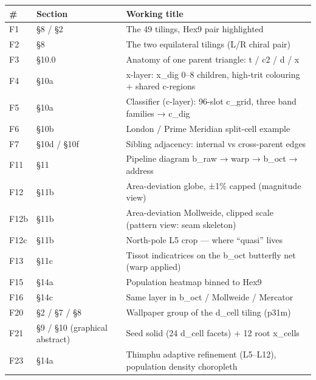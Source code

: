 \documentclass[
  11pt,
  a4paper,
]{article}
\newcounter{none} %
\begin{document}
{\def\LTcaptype{none} %
\begin{longtable}[]{@{}
  >{\raggedright\arraybackslash}p{}
  >{\raggedright\arraybackslash}p{}
  >{\raggedright\arraybackslash}p{}@{}}
\toprule\noalign{}
\begin{minipage}[b]{\linewidth}\raggedright
\#
\end{minipage} & \begin{minipage}[b]{\linewidth}\raggedright
Section
\end{minipage} & \begin{minipage}[b]{\linewidth}\raggedright
Working title
\end{minipage} \\
\midrule\noalign{}
\endhead
\bottomrule\noalign{}
\endlastfoot
F1 & §8 / §2 & The 49 tilings, Hex9 pair highlighted \\
F2 & §8 & The two equilateral tilings (L/R chiral pair) \\
F3 & §10.0 & Anatomy of one parent triangle: t / c2 / d / x \\
F4 & §10a & x-layer: x\_dig 0--8 children, high-trit colouring + shared
c-regions \\
F5 & §10a & Classifier (c-layer): 96-slot c\_grid, three band families →
c\_dig \\
F6 & §10b & London / Prime Meridian split-cell example \\
F7 & §10d / §10f & Sibling adjacency: internal vs cross-parent edges \\
F11 & §11 & Pipeline diagram b\_raw → warp → b\_oct → address \\
F12 & §11b & Area-deviation globe, ±1\% capped (magnitude view) \\
F12b & §11b & Area-deviation Mollweide, clipped scale (pattern view:
seam skeleton) \\
F12c & §11b & North-pole L5 crop --- where ``quasi'' lives \\
F13 & §11c & Tissot indicatrices on the b\_oct butterfly net (warp
applied) \\
F15 & §14a & Population heatmap binned to Hex9 \\
F16 & §14c & Same layer in b\_oct / Mollweide / Mercator \\
F20 & §2 / §7 / §8 & Wallpaper group of the d\_cell tiling (p31m) \\
F21 & §9 / §10 (graphical abstract) & Seed solid (24 d\_cell facets) +
12 root x\_cells \\
F23 & §14a & Thimphu adaptive refinement (L5--L12), population density
choropleth \\
\end{longtable}
}
\end{document}
